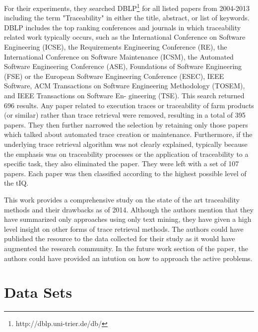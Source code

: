 \documentclass{report}
\begin{document}
For their experiments, they searched DBLP\footnote{http://dblp.uni-trier.de/db/} for all listed papers 
from 2004-2013 including the term "Traceability" in either the title, abstract, or list of keywords. 
DBLP includes the top ranking conferences and journals in which traceability related work typically
occurs, such as the International Conference on Software Engineering (ICSE), the Requirements Engineering
Conference (RE), the International Conference on Software Maintenance (ICSM), the Automated Software 
Engineering Conference (ASE), Foundations of Software Engineering (FSE) or the European Software 
Engineering Conference (ESEC), IEEE Software, ACM Transactions on Software Engineering Methodology 
(TOSEM), and IEEE Transactions on Software En- gineering (TSE). This search returned 696 results. Any 
paper related to execution traces or traceability of farm products (or similar) rather than trace 
retrieval were removed, resulting in a total of 395 papers. They then further narrowed the selection by 
retaining only those papers which talked about automated trace creation or maintenance. Furthermore, if 
the underlying trace retrieval algorithm was not clearly explained, typically because the emphasis was 
on traceability processes or the application of traceability to a specific task, they also eliminated the
paper. They were left with a set of 107 papers. Each paper was then classified according to the highest
possible level of the tIQ.

This work provides a comprehensive study on the state of the art traceability methods and their drawbacks
as of 2014. Although the authors mention that they have summarized only approaches using only text mining,
they have given a high level insight on other forms of trace retrieval methods. The authors could have 
published the resource to the data collected for their study as it would have augmented the research 
community. In the future work section of the paper, the authors could have provided an intution on
how to approach the active problems.

\section{Data Sets}
\label{sec:datasets}
\end{document}
